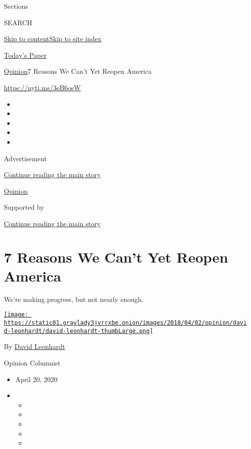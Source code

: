 Sections

SEARCH

\protect\hyperlink{site-content}{Skip to
content}\protect\hyperlink{site-index}{Skip to site index}

\href{https://myaccount.nytimes3xbfgragh.onion/auth/login?response_type=cookie\&client_id=vi}{}

\href{https://www.nytimes3xbfgragh.onion/section/todayspaper}{Today's
Paper}

\href{/section/opinion}{Opinion}\textbar{}7 Reasons We Can't Yet Reopen
America

\url{https://nyti.ms/3eB6osW}

\begin{itemize}
\item
\item
\item
\item
\item
\end{itemize}

Advertisement

\protect\hyperlink{after-top}{Continue reading the main story}

\href{/section/opinion}{Opinion}

Supported by

\protect\hyperlink{after-sponsor}{Continue reading the main story}

\hypertarget{7-reasons-we-cant-yet-reopen-america}{%
\section{7 Reasons We Can't Yet Reopen
America}\label{7-reasons-we-cant-yet-reopen-america}}

We're making progress, but not nearly enough.

\href{https://www.nytimes3xbfgragh.onion/by/david-leonhardt}{\texttt{[image: https://static01.graylady3jvrrxbe.onion/images/2018/04/02/opinion/david-leonhardt/david-leonhardt-thumbLarge.png]}}

By \href{https://www.nytimes3xbfgragh.onion/by/david-leonhardt}{David
Leonhardt}

Opinion Columnist

\begin{itemize}
\item
  April 20, 2020
\item
  \begin{itemize}
  \item
  \item
  \item
  \item
  \item
  \end{itemize}
\end{itemize}

